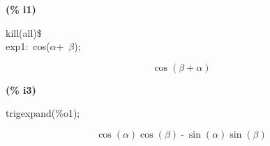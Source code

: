 \documentclass[fleqn]{article}
\begin{document}
\noindent
\begin{minipage}[t]{4.000000em}\color{red}\bfseries
(\% i1)	
\end{minipage}
\begin{minipage}[t]{\textwidth}\color{blue}
kill(all)\$\\
exp1:\ cos(\ensuremath{\alpha}+\ \ensuremath{\beta});
\end{minipage}
\[\displaystyle \tag{\% o1} 
\cos{\left( \beta \operatorname{+}\alpha \right) }\mbox{}
\]


\noindent
\begin{minipage}[t]{4.000000em}\color{red}\bfseries
(\% i3)	
\end{minipage}
\begin{minipage}[t]{\textwidth}\color{blue}
trigexpand(\%o1);
\end{minipage}
\[\displaystyle \tag{\% o3} 
\cos{\left( \alpha \right) } \cos{\left( \beta \right) }\operatorname{-}\sin{\left( \alpha \right) } \sin{\left( \beta \right) }\mbox{}
\]
\end{document}

